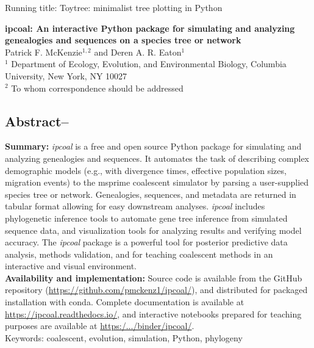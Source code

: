 \documentclass[11pt]{article}
\begin{document}
\noindent Running title: Toytree: minimalist tree plotting in Python\\

\begin{center}
{\bf \Large 
ipcoal: An interactive Python package for simulating and analyzing genealogies and sequences on a species tree or network
}\\[0.25cm]

Patrick F. McKenzie$^{1, 2}$ and Deren A. R. Eaton$^{1}$\\[0.25cm]

$^{1}$ Department of Ecology, Evolution, and Environmental Biology, Columbia University, New York, NY 10027 \\
$^{2}$ To whom correspondence should be addressed

\end{center}
\noindent

\subsection*{Abstract--}
\textbf{Summary:} \emph{ipcoal} is a free and open source Python package for simulating and analyzing genealogies and sequences. It automates the task of describing complex demographic models (e.g., with divergence times, effective population sizes, migration events) to the msprime coalescent simulator by parsing a user-supplied species tree or network. Genealogies, sequences, and metadata are returned in tabular format allowing for easy downstream analyses. \emph{ipcoal} includes phylogenetic inference tools to automate gene tree inference from simulated sequence data, and visualization tools for analyzing results and verifying model accuracy. The \emph{ipcoal} package is a powerful tool for posterior predictive data analysis, methods validation, and for teaching coalescent methods in an interactive and visual environment. \\

\noindent \textbf{Availability and implementation:} Source code is available from the GitHub repository (\url{https://github.com/pmckenz1/ipcoal/}), and distributed for packaged installation with conda. Complete documentation is available at \url{https://ipcoal.readthedocs.io/}, and interactive notebooks prepared for teaching purposes are available at \url{https:/.../binder/ipcoal/}.\\

\noindent Keywords: coalescent, evolution, simulation, Python, phylogeny
\end{document}
